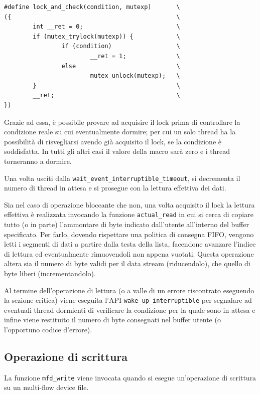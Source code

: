 \documentclass{article}
\begin{document}
\newpage
\begin{lstlisting}[label=lst-1, caption={Macro \texttt{lock\_and\_check}}]
#define lock_and_check(condition, mutexp)       \
({                                              \
        int __ret = 0;                          \
        if (mutex_trylock(mutexp)) {            \
                if (condition)                  \
                        __ret = 1;              \
                else                            \
                        mutex_unlock(mutexp);   \
        }                                       \
        __ret;                                  \
})
\end{lstlisting}
Grazie ad essa, è possibile provare ad acquisire il lock prima di controllare la condizione reale su cui eventualmente dormire; per cui un solo thread ha la possibilità di risvegliarsi avendo già acquisito il lock, se la condizione è soddisfatta. In tutti gli altri casi il valore della macro sarà zero e i thread torneranno a dormire.

Una volta usciti dalla \texttt{wait\_event\_interruptible\_timeout}, si decrementa il numero di thread in attesa e si prosegue con la lettura effettiva dei dati.

Sia nel caso di operazione bloccante che non, una volta acquisito il lock la lettura effettiva è realizzata invocando la funzione \texttt{actual\_read} in cui si cerca di copiare tutto (o in parte) l'ammontare di byte indicato dall'utente all'interno del buffer specificato. Per farlo, dovendo rispettare una politica di consegna FIFO, vengono letti i segmenti di dati a partire dalla testa della lista, facendone avanzare l'indice di lettura ed eventualmente rimuovendoli non appena vuotati. Questa operazione altera sia il numero di byte validi per il data stream (riducendolo), che quello di byte liberi (incrementandolo).

Al termine dell'operazione di lettura (o a valle di un errore riscontrato eseguendo la sezione critica) viene eseguita l'API \texttt{wake\_up\_interruptible} per segnalare ad eventuali thread dormienti di verificare la condizione per la quale sono in attesa e infine viene restituito il numero di byte consegnati nel buffer utente (o l'opportuno codice d'errore).

\subsection{Operazione di scrittura}
La funzione \texttt{mfd\_write} viene invocata quando si esegue un'operazione di scrittura su un multi-flow device file.
\end{document}
